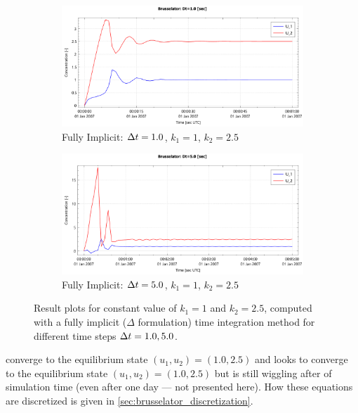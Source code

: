 \begin{figure}[H]
    \begin{subfigure}{0.5\textwidth}
        \includegraphics[width=\textwidth]{figures/brusselator_imp_dt=1d00.pdf}
        \caption{Fully Implicit: $\Delta t=1.0$, $k_1=1$, $k_2=2.5$}\label{fig:imp_dt=1d00}
    \end{subfigure}
    \begin{subfigure}{0.5\textwidth}
        \includegraphics[width=\textwidth]{figures/brusselator_imp_dt=5d00.pdf}
        \caption{Fully Implicit: $\Delta t=5.0$, $k_1=1$, $k_2=2.5$}\label{fig:imp_dt=5d00}
    \end{subfigure}
    \caption{Result plots for constant value of $k_1 = 1$ and $k_2 =2.5$, computed with a fully implicit ($\Delta$ formulation) time integration method for different time steps $\Delta t = 1.0, 5.0$.
    }
\end{figure}
 converge to the equilibrium state $(u_1, u_2) = (1.0, 2.5)$ and
 looks to converge to the equilibrium state $(u_1, u_2) = (1.0, 2.5)$ but is still wiggling after  of simulation time (even after one day --- not presented here).
How these equations are discretized is given in \autoref{sec:brusselator_discretization}.

